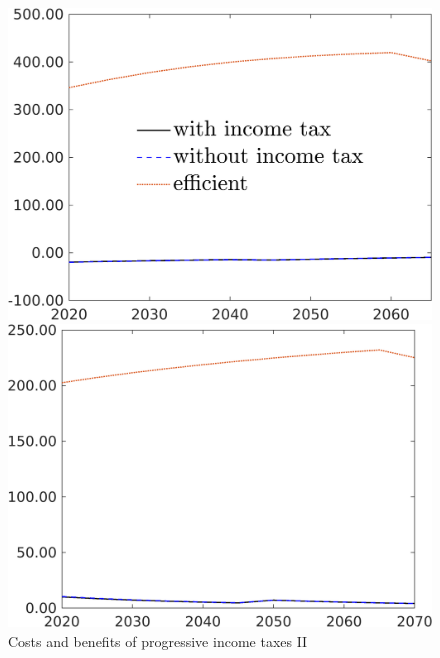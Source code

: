 \begin{figure}[h!!]
	\caption{Costs and benefits of progressive income taxes II }\label{fig:optAll_percLf_dyn_app}
	\begin{minipage}[]{0.32\textwidth}
		\includegraphics[width=1\textwidth]{../../codding_model/own_basedOnFried/optimalPol_190722_tidiedUp/figures/all_10Aout22/gAagg_PercentageLFDynNT_Target_regime3_spillover0_noskill0_sep1_xgrowth0_PV1_etaa0.79_lgd1.png}
	\end{minipage}
	\begin{minipage}[]{0.32\textwidth}
		\includegraphics[width=1\textwidth]{../../codding_model/own_basedOnFried/optimalPol_190722_tidiedUp/figures/all_10Aout22/S_PercentageLfDynNT_Target_regime3_spillover0_noskill0_sep1_xgrowth0_PV1_etaa0.79_lgd0.png}

\end{minipage}
\end{figure}
